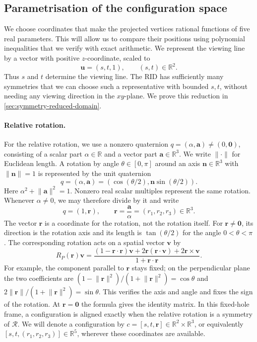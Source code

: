 \subsection{Parametrisation of the configuration space}\label{subsec:parametrisation-of-the-configuration-space}

We choose coordinates that make the projected vertices rational functions
of five real parameters. This will allow us to compare their positions using
polynomial inequalities that we verify with exact arithmetic. We represent
the viewing line by a vector with positive $z$-coordinate, scaled to
\[
  \mathbf u=(s,t,1),\qquad (s,t)\in\mathbb R^2.
\]
Thus $s$ and $t$ determine the viewing line. The RID has sufficiently many symmetries
that we can choose such a representative with bounded $s,t$, without needing
any viewing direction in the $xy$-plane. We prove this reduction in
\cref{sec:symmetry-reduced-domain}.

\paragraph{Relative rotation.}
For the relative rotation, we use a nonzero quaternion
$q=(\alpha,\mathbf a)\ne(0,\mathbf0)$, consisting of a scalar part
$\alpha\in\mathbb R$ and a vector part $\mathbf a\in\mathbb R^3$.
We write $\lVert\cdot\rVert$ for Euclidean length.
A rotation by angle $\theta\in[0,\pi]$ around an axis
$\mathbf n\in\mathbb R^3$ with $\lVert\mathbf n\rVert=1$ is
represented by the unit quaternion
\[
  q=(\alpha,\mathbf a)=(\cos(\theta/2),\mathbf n\sin(\theta/2)).
\]
Here $\alpha^2+\lVert\mathbf a\rVert^2=1$. Nonzero real scalar multiples
represent the same rotation. Whenever $\alpha\ne0$, we may
therefore divide by it and write
\[
  q=(1,\mathbf r),\qquad
  \mathbf r=\frac{\mathbf a}{\alpha}=(r_1,r_2,r_3)\in\mathbb R^3.
\]
The vector $\mathbf r$ is a coordinate for the rotation, not the rotation
itself. For $\mathbf r\ne\mathbf 0$, its direction is the rotation axis and its
length is $\tan(\theta/2)$ for the angle $0<\theta<\pi$. The corresponding rotation
acts on a spatial vector $\mathbf v$ by
\begin{equation}\label{eq:relative-rotation}
  R_{P}(\mathbf r)\mathbf v
  =\frac{(1-\mathbf r\cdot\mathbf r)\mathbf v
      +2\mathbf r(\mathbf r\cdot\mathbf v)+2\mathbf r\times\mathbf v}
     {1+\mathbf r\cdot\mathbf r}.
\end{equation}
For example, the component parallel to $\mathbf r$ stays fixed; on the
perpendicular plane the two coefficients are
$(1-\lVert\mathbf r\rVert^2)/(1+\lVert\mathbf r\rVert^2)=\cos\theta$
and $2\lVert\mathbf r\rVert/(1+\lVert\mathbf r\rVert^2)=\sin\theta$.
This verifies the axis and angle and fixes the sign of the rotation.
At $\mathbf r=\mathbf 0$ the formula gives the identity matrix. In this
fixed-hole frame, a configuration is aligned exactly when the relative
rotation is a symmetry of $\mathcal R$.
We will denote a configuration by
$c=[s,t,\mathbf r]\in\mathbb R^2\times\mathbb R^3$, or equivalently
$[s,t,(r_1,r_2,r_3)]\in\mathbb R^5$, wherever these
coordinates are available.

